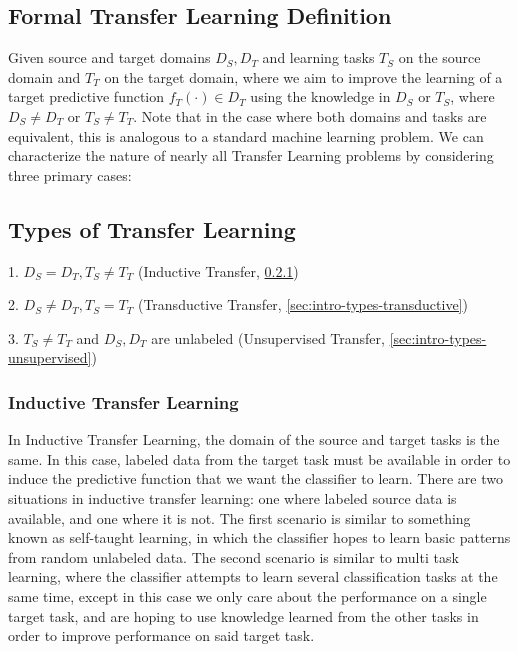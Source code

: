 \documentclass[10pt,twocolumn,letterpaper]{article}
\begin{document}
   \subsection{Formal Transfer Learning Definition} \label{sec:intro-def}
      Given source and target domains $D_S, D_T$ and learning tasks $T_S$ on the source domain and $T_T$ on the target
      domain, where we aim to improve the learning of a target predictive function $f_T(\cdot)\in D_T$ using
      the knowledge in $D_S$ or $T_S$, where $D_S\neq D_T$ or $T_S\neq T_T$. Note that in the case where both domains
      and tasks are equivalent, this is analogous to a standard machine learning problem. We can characterize the
      nature of nearly all Transfer Learning problems by considering three primary cases:

   \subsection{Types of Transfer Learning} \label{sec:intro-types}

      1. $D_S = D_T, T_S\neq T_T$ (Inductive Transfer, \ref{sec:intro-types-inductive})

      2. $D_S\neq D_T, T_S = T_T$ (Transductive Transfer, \ref{sec:intro-types-transductive})

      3. $T_S\neq T_T$ and $D_S, D_T$ are unlabeled (Unsupervised Transfer, \ref{sec:intro-types-unsupervised})

      \subsubsection{Inductive Transfer Learning} \label{sec:intro-types-inductive}

         In Inductive Transfer Learning, the domain of the source and target tasks is the same. In this case, labeled data
         from the target task must be available in order to induce the predictive function that we want the classifier to learn.
         There are two situations in inductive transfer learning: one where labeled source data is available, and one where it
         is not. The first scenario is similar to something known as self-taught learning, in which the classifier hopes to
         learn basic patterns from random unlabeled data. The second scenario is similar to multi task learning, where the
         classifier attempts to learn several classification tasks at the same time, except in this case we only care about
         the performance on a single target task, and are hoping to use knowledge learned from the other tasks in order to
         improve performance on said target task.
\end{document}
